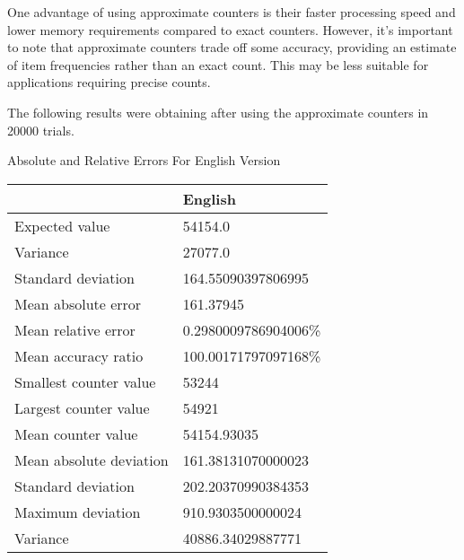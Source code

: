 \documentclass[]{revdetua}
\begin{document}
One advantage of using approximate counters is their faster processing speed and lower memory requirements compared to exact counters. However, it's important to note that approximate counters trade off some accuracy, providing an estimate of item frequencies rather than an exact count. This may be less suitable for applications requiring precise counts.

The following results were obtaining after using the approximate counters in 20000 trials.

\begin{table}[!ht]
    \centering
    Absolute and Relative Errors For English Version\linebreak\linebreak
    \begin{tabular}{|l|l|}
    \hline
        ~ & English \\ \hline
        Expected value & 54154.0 \\ \hline
        Variance & 27077.0 \\ \hline
        Standard deviation & 164.55090397806995 \\ \hline
        Mean absolute error & 161.37945 \\ \hline
        Mean relative error & 0.2980009786904006\% \\ \hline
        Mean accuracy ratio & 100.00171797097168\% \\ \hline
        Smallest counter value & 53244 \\ \hline
        Largest counter value & 54921 \\ \hline
        Mean counter value & 54154.93035 \\ \hline
        Mean absolute deviation & 161.38131070000023 \\ \hline
        Standard deviation & 202.20370990384353 \\ \hline
        Maximum deviation & 910.9303500000024 \\ \hline
        Variance & 40886.34029887771 \\ \hline
    \end{tabular}
\end{table}
\end{document}
